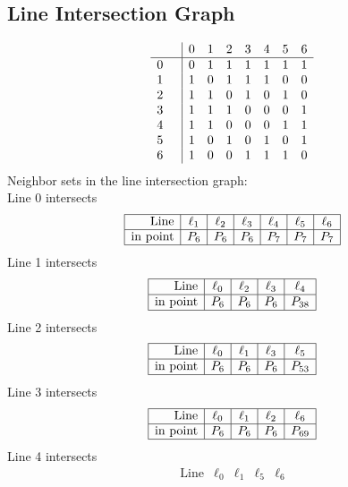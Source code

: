 \documentclass{article}
\begin{document}
{\subsection*{Line Intersection Graph}
{\arraycolsep=1pt
$$
\begin{array}{rr|*{7}r}
 &  & 0 & 1 & 2 & 3 & 4 & 5 & 6\\
\hline
0 &  & 0 & 1 & 1 & 1 & 1 & 1 & 1\\
1 &  & 1 & 0 & 1 & 1 & 1 & 0 & 0\\
2 &  & 1 & 1 & 0 & 1 & 0 & 1 & 0\\
3 &  & 1 & 1 & 1 & 0 & 0 & 0 & 1\\
4 &  & 1 & 1 & 0 & 0 & 0 & 1 & 1\\
5 &  & 1 & 0 & 1 & 0 & 1 & 0 & 1\\
6 &  & 1 & 0 & 0 & 1 & 1 & 1 & 0\\
\end{array}
$$
}%
Neighbor sets in the line intersection graph:\\
Line 0 intersects 
$$
\begin{array}{|r*{6}{|c}|}
\hline
\mbox{Line}  & \ell_{1} & \ell_{2} & \ell_{3} & \ell_{4} & \ell_{5} & \ell_{6}\\
\hline
\mbox{in point}  & P_{6} & P_{6} & P_{6} & P_{7} & P_{7} & P_{7}\\
\hline
\end{array}
$$
Line 1 intersects 
$$
\begin{array}{|r*{4}{|c}|}
\hline
\mbox{Line}  & \ell_{0} & \ell_{2} & \ell_{3} & \ell_{4}\\
\hline
\mbox{in point}  & P_{6} & P_{6} & P_{6} & P_{38}\\
\hline
\end{array}
$$
Line 2 intersects 
$$
\begin{array}{|r*{4}{|c}|}
\hline
\mbox{Line}  & \ell_{0} & \ell_{1} & \ell_{3} & \ell_{5}\\
\hline
\mbox{in point}  & P_{6} & P_{6} & P_{6} & P_{53}\\
\hline
\end{array}
$$
Line 3 intersects 
$$
\begin{array}{|r*{4}{|c}|}
\hline
\mbox{Line}  & \ell_{0} & \ell_{1} & \ell_{2} & \ell_{6}\\
\hline
\mbox{in point}  & P_{6} & P_{6} & P_{6} & P_{69}\\
\hline
\end{array}
$$
Line 4 intersects 
$$
\begin{array}{|r*{4}{|c}|}
\hline
\mbox{Line}  & \ell_{0} & \ell_{1} & \ell_{5} & \ell_{6}\\

\end{array}$$}
\end{document}
